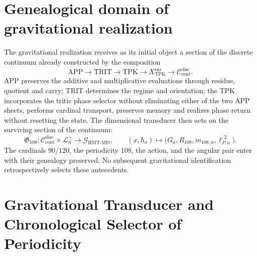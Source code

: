 \section{Genealogical domain of gravitational realization}
\label{sec:l9s102:gravedad-dominio-genealogico}

The gravitational realization receives as its initial object a section of the
discrete continuum already constructed by the composition
\begin{equation}
 \mathrm{APP}\longrightarrow\mathrm{TRIT}\longrightarrow\mathrm{TPK}
 \longrightarrow X_{\mathrm{TPK}}^{\mathrm{enr}}
 \longrightarrow\mathcal C_{\mathrm{cont}}^{\mathrm{disc}}.
 \label{eq:l9s102:gravedad-cadena-genealogica}
\end{equation}
APP preserves the additive and multiplicative evaluations through residue,
quotient and carry; TRIT determines the regime and orientation; the TPK
incorporates the tritic phase selector without eliminating either of the two APP
sheets, performs cardinal transport, preserves memory and realizes phase
return without resetting the state. The dimensional
transducer then acts on the surviving section of the continuum:
\begin{equation}
 \mathfrak G_{108}:\mathcal C_{\mathrm{cont}}^{\mathrm{disc}}
 \times\mathcal L_S^+
 \longrightarrow\mathcal G_{\mathrm{HMT\text{-}MD}},
 \qquad
 (x,\hbar_a)\longmapsto
 \bigl(G_a,R_{108},m_{108,a},\ell_{P,a}^{,2}\bigr).
 \label{eq:l9s102:gravedad-mapa-realizacion}
\end{equation}
The cardinals \(90/120\), the periodicity \(108\), the action, and the angular
pair enter with their genealogy preserved. No subsequent gravitational
identification retrospectively selects these antecedents.

\section{Gravitational Transducer and Chronological Selector of Periodicity}
\label{sec:l9s102:gravedad-transductor}

